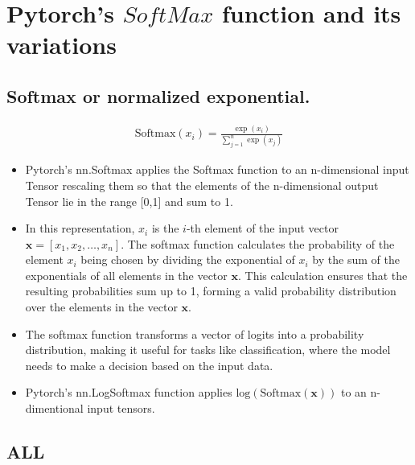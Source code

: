 \clearpage

\section{Pytorch's $SoftMax$ function and its variations}

\subsection*{Softmax or normalized exponential.} \label{sec:softmax}

\begin{align}
    \text{Softmax}(x_i) = \frac{{\exp(x_i)}}{{\sum_{j=1}^n \exp(x_j)}} \label{eq:softmax}
\end{align}

\begin{itemize}
    \item Pytorch's nn.Softmax applies the Softmax function to an n-dimensional input Tensor rescaling them so that the elements of the n-dimensional output Tensor lie in the range [0,1] and sum to 1.
    \item In this representation, \(x_i\) is the \(i\)-th element of the input vector \(\mathbf{x} = [x_1, x_2, \ldots, x_n]\). The softmax function calculates the probability of the element \(x_i\) being chosen by dividing the exponential of \(x_i\) by the sum of the exponentials of all elements in the vector \(\mathbf{x}\). This calculation ensures that the resulting probabilities sum up to 1, forming a valid probability distribution over the elements in the vector \(\mathbf{x}\).
    \item The softmax function transforms a vector of logits into a probability distribution, making it useful for tasks like classification, where the model needs to make a decision based on the input data.
    \item Pytorch's nn.LogSoftmax function applies $\text{log}\left(\text{Softmax}(\mathbf{x})\right)$ to an n-dimentional input tensors. \\
\end{itemize}






\subsection*{\acf{ALL}}

